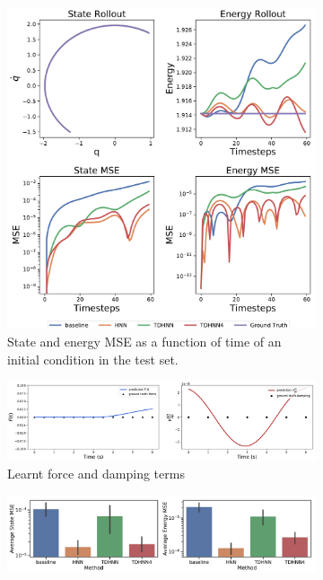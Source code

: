 \documentclass{article}
\begin{document}
\begin{figure}[h!]
\centering
\captionsetup{justification=centering}
	\begin{subfigure}[b]{0.4\textwidth}
		\centering
		\includegraphics[width=\textwidth, trim={0 0 0 12cm},clip]{figures/figures/mass_spring/1/mass_spring_long_0.pdf}
		\caption{State and energy MSE as a function of time of an initial condition in the test set.}
	\end{subfigure}
	\begin{subfigure}[b]{0.48\textwidth}
		\centering
		\includegraphics[width=\textwidth]{figures/figures/mass_spring/1/mass_spring_dpdt_new_0.pdf}
		\caption{Learnt force and damping terms}
	\end{subfigure}
	\begin{subfigure}[b]{0.48\textwidth}
	    \centering
		\includegraphics[width=\textwidth]{figures/figures/mass_spring/1/mass_spring_errors_0.pdf}

\end{subfigure}
\end{figure}
\end{document}
